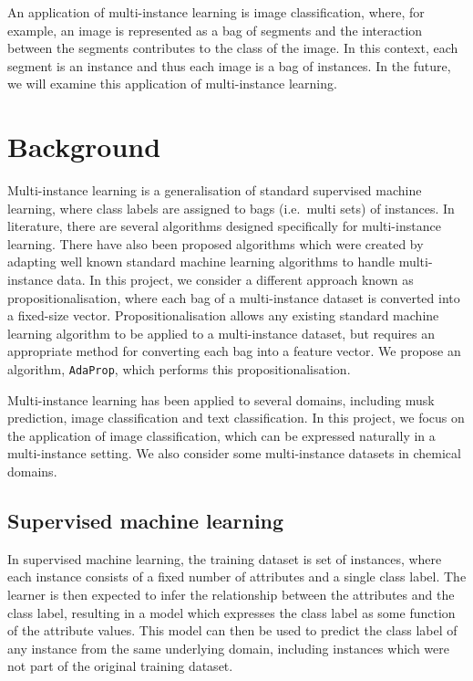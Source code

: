 \documentclass[a4paper,12pt]{report} %
\newcommand{\AdaProp}{\texttt{AdaProp}\xspace}
\begin{document}
An application of multi-instance learning is image classification,
    where, for example, 
    an image is represented as a bag of segments and 
    the interaction between the segments contributes 
    to the class of the image. 
In this context, 
    each segment is an instance and 
    thus each image is a bag of instances. 
In the future, we will examine this application of multi-instance learning.

\tableofcontents

\chapter{Background}

Multi-instance learning is a generalisation of 
    standard supervised machine learning,
    where class labels are assigned to bags (i.e.\ multi sets) of instances.
In literature, there are several algorithms
    designed specifically for multi-instance learning.
There have also been proposed algorithms which were created by 
    adapting well known standard machine learning algorithms to handle
    multi-instance data.
In this project, we consider a different approach known as propositionalisation,
    where each bag of a multi-instance dataset is converted into a fixed-size 
    vector.
Propositionalisation allows any existing standard machine learning algorithm
    to be applied to a multi-instance dataset, 
    but requires an appropriate method for converting each bag into a feature vector.
We propose an algorithm, \AdaProp, which performs this propositionalisation.
  
Multi-instance learning has been applied to several domains,
    including musk prediction, image classification and text classification.
In this project, we focus on the application of image classification,
    which can be expressed naturally in a multi-instance setting.
We also consider some multi-instance datasets in chemical domains.

\section{Supervised machine learning}

In supervised machine learning, the training dataset is set of instances, 
    where each instance consists of a fixed number of attributes 
    and a single class label.
The learner is then expected to infer the relationship between the 
    attributes and the class label,
    resulting in a model which expresses the class label as 
    some function of the attribute values.
This model can then be used to predict the class label of 
    any instance from the same underlying domain, 
    including instances which were not part of the original training dataset.
\end{document}
